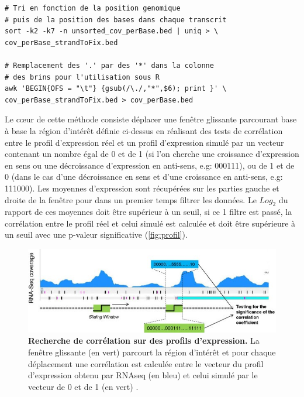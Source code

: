 \documentclass[12pt,a4paper]{report}
\begin{document}
\begin{onehalfspace}
\begin{lstlisting}[frame=single]
# Tri en fonction de la position genomique 
# puis de la position des bases dans chaque transcrit
sort -k2 -k7 -n unsorted_cov_perBase.bed | uniq > \
cov_perBase_strandToFix.bed

# Remplacement des '.' par des '*' dans la colonne
# des brins pour l'utilisation sous R
awk 'BEGIN{OFS = "\t"} {gsub(/\./,"*",$6); print }' \
cov_perBase_strandToFix.bed > cov_perBase.bed
\end{lstlisting}
Le cœur de cette méthode consiste déplacer une fenêtre glissante parcourant base à base la région d'intérêt définie ci-dessus en réalisant des tests de corrélation entre le profil d'expression réel et un profil d'expression simulé par un vecteur contenant un nombre égal de 0 et de 1 (si l'on cherche une croissance d'expression en sens ou une décroissance d'expression en anti-sens, e.g: 000111), ou de 1 et de 0 (dans le cas d'une décroissance en sens et d'une croissance en anti-sens, e.g: 111000). Les moyennes d'expression sont récupérées sur les parties gauche et droite de la fenêtre pour dans un premier temps filtrer les données. Le $Log_2$ du rapport de ces moyennes doit être supérieur à un seuil, si ce 1 filtre est passé, la corrélation entre le profil réel et celui simulé est calculée et doit être supérieure à un seuil avec une p-valeur significative (\autoref{fig:profil}). 

\begin{figure}[ht]
\centerline{\includegraphics[scale=0.6]{figures/profil.jpg}}
\caption{\textbf{Recherche de corrélation sur des profils d'expression.} La fenêtre glissante (en vert) parcourt la région d'intérêt et pour chaque déplacement une corrélation est calculée entre le vecteur du profil d'expression obtenu par RNAseq (en bleu) et celui simulé par le vecteur de 0 et de 1 (en vert) \citep{Fortino2014}.}
\label{fig:profil} 
\end{figure}


\end{onehalfspace}
\end{document}
